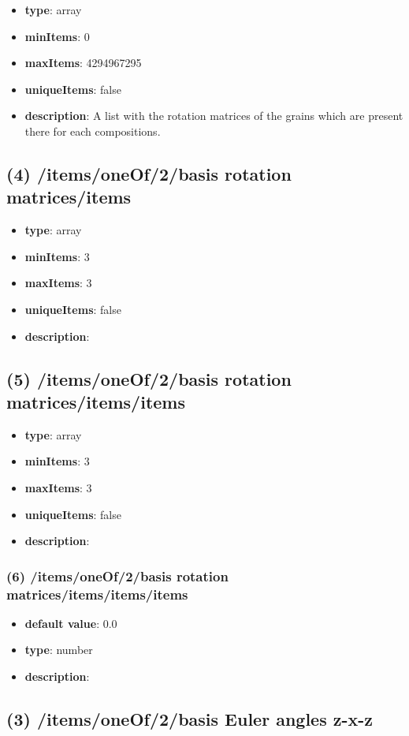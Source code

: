 \begin{itemize}[leftmargin=3em]\item {\bf type}: array
\item {\bf minItems}: 0
\item {\bf maxItems}: 4294967295
\item {\bf uniqueItems}: false
\item {\bf description}: A list with the rotation matrices of the grains which are present there for each compositions.
\end{itemize}\subsection{(4) /items/oneOf/2/basis rotation matrices/items}
\begin{itemize}[leftmargin=4em]\item {\bf type}: array
\item {\bf minItems}: 3
\item {\bf maxItems}: 3
\item {\bf uniqueItems}: false
\item {\bf description}: 
\end{itemize}\subsection{(5) /items/oneOf/2/basis rotation matrices/items/items}
\begin{itemize}[leftmargin=5em]\item {\bf type}: array
\item {\bf minItems}: 3
\item {\bf maxItems}: 3
\item {\bf uniqueItems}: false
\item {\bf description}: 
\end{itemize}\subsubsection{(6) /items/oneOf/2/basis rotation matrices/items/items/items}
\begin{itemize}[leftmargin=6em]\item {\bf default value}: 0.0
\item {\bf type}: number
\item {\bf description}: 
\end{itemize}\subsection{(3) /items/oneOf/2/basis Euler angles z-x-z}
